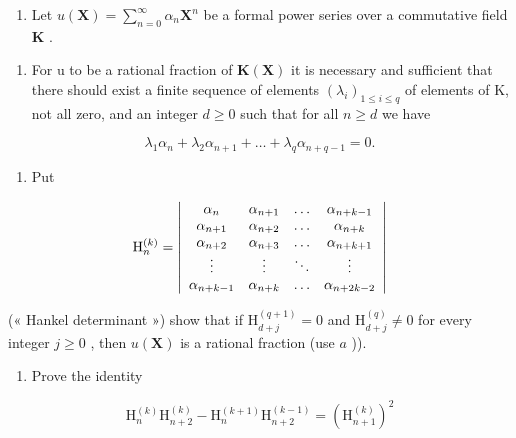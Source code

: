 \BourbakiExerciseGroup

\begin{enumerate}
\def\labelenumi{\arabic{enumi})}
\tightlist
\item
  Let \(u(\mathbf{X}) = \sum_{n=0}^{\infty} \alpha_n \mathbf{X}^n\) be a formal power series over a commutative field \(\mathbf{K}\) .
\end{enumerate}

\begin{enumerate}
\def\labelenumi{\alph{enumi})}
\tightlist
\item
  For u to be a rational fraction of \(\mathbf{K}(\mathbf{X})\) it is necessary and sufficient that there should exist a finite sequence of elements \((\lambda_{i})_{1\leq i\leq q}\) of elements of K, not all zero, and an integer \(d\geq0\) such that for all \(n\geq d\) we have
\end{enumerate}

\[
\lambda_ {1} \alpha_ {n} + \lambda_ {2} \alpha_ {n + 1} + \dots + \lambda_ {q} \alpha_ {n + q - 1} = 0.
\]

\begin{enumerate}
\def\labelenumi{\alph{enumi})}
\setcounter{enumi}{1}
\tightlist
\item
  Put
\end{enumerate}

\[
\mathrm{H} _ {n} ^ {(k)} = \left| \begin{array}{c c c c} \alpha_ {n} & \alpha_ {n + 1} & \dots & \alpha_ {n + k - 1} \\ \alpha_ {n + 1} & \alpha_ {n + 2} & \dots & \alpha_ {n + k} \\ \alpha_ {n + 2} & \alpha_ {n + 3} & \dots & \alpha_ {n + k + 1} \\ \vdots & \vdots & \ddots & \vdots \\ \alpha_ {n + k - 1} & \alpha_ {n + k} & \dots & \alpha_ {n + 2 k - 2} \end{array} \right|
\]

(« Hankel determinant ») show that if \(\mathrm{H}_{d+j}^{(q+1)} = 0\) and \(\mathrm{H}_{d+j}^{(q)} \neq 0\) for every integer \(j \geqslant 0\) , then \(u(\mathbf{X})\) is a rational fraction (use \(a\) )).

\begin{enumerate}
\def\labelenumi{\alph{enumi})}
\setcounter{enumi}{2}
\tightlist
\item
  Prove the identity
\end{enumerate}

\[
\mathrm{H} _ {n} ^ {(k)} \mathrm{H} _ {n + 2} ^ {(k)} - \mathrm{H} _ {n} ^ {(k + 1)} \mathrm{H} _ {n + 2} ^ {(k - 1)} = (\mathrm{H} _ {n + 1} ^ {(k)}) ^ {2}
\]

